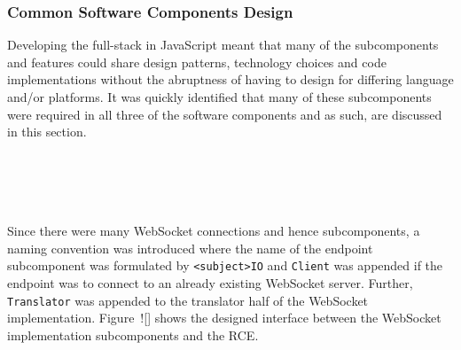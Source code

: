     \subsubsection{Common Software Components Design}
    \label{subsec:commonSoftwareComponentDesign}
      Developing the full-stack in JavaScript meant that many of the subcomponents and features could share design patterns, technology choices and code implementations without the abruptness of having to design for differing language and/or platforms. It was quickly identified that many of these subcomponents were required in all three of the software components and as such, are discussed in this section.
      
      \\\\
        
      
      \\\\
        Since there were many WebSocket connections and hence subcomponents, a naming convention was introduced where the name of the endpoint subcomponent was formulated by \texttt{<subject>IO} and \texttt{Client} was appended if the endpoint was to connect to an already existing WebSocket server. Further, \texttt{Translator} was appended to the translator half of the WebSocket implementation. Figure~![] shows the designed interface between the WebSocket implementation subcomponents and the RCE.
      